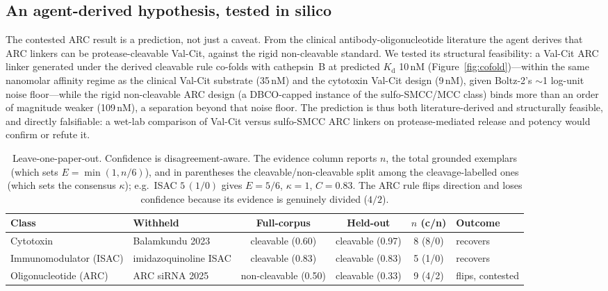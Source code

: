 \documentclass[10pt]{article}
\begin{document}
\subsection{An agent-derived hypothesis, tested in silico}
The contested ARC result is a prediction, not just a caveat. From the clinical antibody-oligonucleotide literature the agent derives that ARC linkers can be protease-cleavable Val-Cit, against the rigid non-cleavable standard. We tested its structural feasibility: a Val-Cit ARC linker generated under the derived cleavable rule co-folds with cathepsin~B at predicted $K_\mathrm{d}$ 10\,nM (Figure~\ref{fig:cofold})---within the same nanomolar affinity regime as the clinical Val-Cit substrate (35\,nM) and the cytotoxin Val-Cit design (9\,nM), given Boltz-2's $\sim$1 log-unit noise floor---while the rigid non-cleavable ARC design (a DBCO-capped instance of the sulfo-SMCC/MCC class) binds more than an order of magnitude weaker (109\,nM), a separation beyond that noise floor. The prediction is thus both literature-derived and structurally feasible, and directly falsifiable: a wet-lab comparison of Val-Cit versus sulfo-SMCC ARC linkers on protease-mediated release and potency would confirm or refute it.

\begin{table}[t]\centering\caption{Leave-one-paper-out. Confidence is disagreement-aware. The evidence column reports $n$, the total grounded exemplars (which sets $E=\min(1,n/6)$), and in parentheses the cleavable/non-cleavable split among the cleavage-labelled ones (which sets the consensus $\kappa$); e.g.\ ISAC $5\,(1/0)$ gives $E=5/6$, $\kappa=1$, $C=0.83$. The ARC rule flips direction and loses confidence because its evidence is genuinely divided ($4/2$).}\label{tab:heldout}\footnotesize
\setlength{\tabcolsep}{4pt}
\begin{tabular}{l l c c c l}\toprule
Class & Withheld & Full-corpus & Held-out & $n$ (c/n) & Outcome \\ \midrule
Cytotoxin & Balamkundu 2023 & cleavable (0.60) & cleavable (0.97) & 8 (8/0) & recovers \\
Immunomodulator (ISAC) & imidazoquinoline ISAC & cleavable (0.83) & cleavable (0.83) & 5 (1/0) & recovers \\
Oligonucleotide (ARC) & ARC siRNA 2025 & non-cleavable (0.50) & cleavable (0.33) & 9 (4/2) & flips, contested \\
\bottomrule\end{tabular}\end{table}
\end{document}
